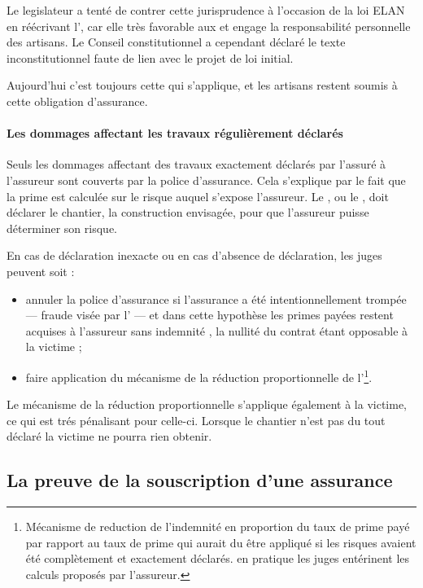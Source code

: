 				Le legislateur a tenté de contrer cette jurisprudence à l'occasion de la loi ELAN en réécrivant l', car elle très favorable aux \Mo et engage la responsabilité personnelle des artisans. Le Conseil constitutionnel a cependant déclaré le texte inconstitutionnel faute de lien avec le projet de loi initial.

				Aujourd’hui c’est toujours cette \JP qui s’applique, et les artisans restent soumis à cette obligation d’assurance.

			\paragraph{Les dommages affectant les travaux régulièrement déclarés}

				Seuls les dommages affectant des travaux exactement déclarés par l’assuré à l’assureur sont couverts par la police d’assurance. Cela s'explique par le fait que la prime est calculée sur le risque auquel s'expose l'assureur. Le \lo, ou le \MO, doit déclarer le chantier, la construction envisagée, pour que l’assureur puisse déterminer son risque.

				\medbreak En cas de déclaration inexacte ou en cas d’absence de déclaration, les juges peuvent soit :
				\begin{itemize}
					\item annuler la police d'assurance si l’assurance a été intentionnellement trompée  --- fraude visée par l' --- et dans cette hypothèse les primes payées restent acquises à l’assureur sans indemnité , la nullité du contrat étant opposable à la victime ;
					\item faire application du mécanisme de la réduction proportionnelle de l'\footnote{Mécanisme de reduction de l'indemnité en proportion du taux de prime payé par rapport au taux de prime qui aurait du être appliqué si les risques avaient été complètement et exactement déclarés. en pratique les juges entérinent les calculs proposés par l’assureur.}.
				\end{itemize}
				Le mécanisme de la réduction proportionnelle s'applique également à la victime, ce qui est trés pénalisant pour celle-ci. Lorsque le chantier n’est pas du tout déclaré la victime ne pourra rien obtenir.

	\subsection{La preuve de la souscription d'une assurance}

